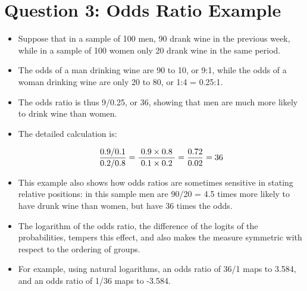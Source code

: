\documentclass[a4paper,12pt]{article}
\begin{document}
\section*{Question 3: Odds Ratio Example}
	\begin{itemize}
		\item Suppose that in a sample of 100 men, 90 drank wine in the previous week, while in a sample of 100 women only 20 drank wine in the same period. \item The odds of a man drinking wine are 90 to 10, or 9:1, while the odds of a woman drinking wine are only 20 to 80, or 1:4 = 0.25:1. 
		\item The odds ratio is thus 9/0.25, or 36, showing that men are much more likely to drink wine than women. 
		\item The detailed calculation is:
		
		
		\[ { 0.9/0.1 \over 0.2/0.8}=\frac{\;0.9\times 0.8\;}{\;0.1\times 0.2\;} ={0.72 \over 0.02} = 36 \]
		
		\item This example also shows how odds ratios are sometimes sensitive in stating relative positions: in this sample men are 90/20 = 4.5 times more likely to have drunk wine than women, but have 36 times the odds. 
		
		
		
		\item The logarithm of the odds ratio, the difference of the logits of the probabilities, tempers this effect, and also makes the measure symmetric with respect to the ordering of groups. 
		\item For example, using natural logarithms, an odds ratio of 36/1 maps to 3.584, and an odds ratio of 1/36 maps to -3.584.
	\end{itemize}

	
\end{document}
